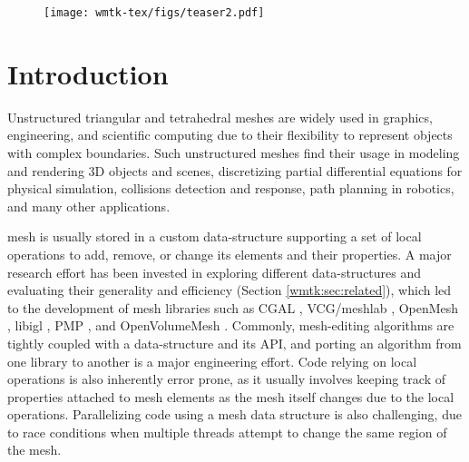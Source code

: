 
\begin{figure}
    \centering\footnotesize
    \texttt{[image: wmtk-tex/figs/teaser2.pdf]}
    \caption{}
    \label{wmtk:fig:teaser}
\end{figure}

\section{Introduction}

Unstructured triangular and tetrahedral meshes are widely used in graphics, engineering, and scientific computing due to their flexibility to represent objects with complex boundaries. Such unstructured meshes find their usage in modeling and rendering 3D objects and scenes, discretizing partial differential equations for physical simulation,  collisions detection and response, path planning in robotics, and many other applications.

 mesh is usually stored in a custom data-structure supporting a set of local operations to add, remove, or change its elements and their properties. A major research effort has been invested in exploring different data-structures and evaluating their generality and efficiency (Section \ref{wmtk:sec:related}), which led to the development of mesh libraries such as CGAL \cite{cgal2008computational}, VCG/meshlab \cite{vcg}, OpenMesh \cite{botsch2002openmesh}, libigl \cite{jacobson2016libigl}, PMP \cite{pmp-library}, and OpenVolumeMesh \cite{kremer2013openvolumemesh}.
Commonly, mesh-editing algorithms are tightly coupled with a data-structure and its API, and porting an algorithm from one library to another is a major engineering effort. 
Code relying on local operations is also inherently error prone, as it usually involves keeping track of properties attached to mesh elements as the mesh itself changes due to the local operations. Parallelizing code using a mesh data structure is also challenging, due to race conditions when multiple threads attempt to change the same region of the mesh. 

